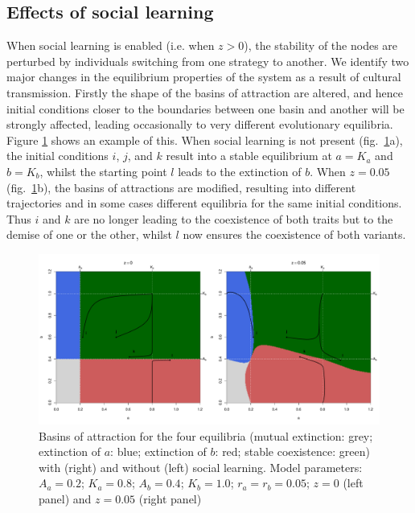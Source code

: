 \documentclass[3p,authoryear,twocolumn]{elsarticle} %
\begin{document}
\subsection{Effects of social learning}

When social learning is enabled (i.e. when $z>0$), the stability of the nodes are perturbed by individuals switching from one strategy to another. We identify two major changes in the equilibrium properties of the system as a result of cultural transmission. Firstly the shape of the basins of attraction are altered, and hence initial conditions closer to the boundaries between one basin and another will be strongly affected,  leading occasionally to very different evolutionary equilibria. Figure \ref{fig:TransmissionBasin} shows an example of this. When social learning is not present (fig.~\ref{fig:TransmissionBasin}a), the initial conditions $i$, $j$, and $k$ result into a stable equilibrium at $a=K_a$ and $b=K_b$, whilst the starting point $l$ leads to the extinction of $b$. When $z=0.05$ (fig.~\ref{fig:TransmissionBasin}b), the basins of attractions are modified, resulting into different trajectories and in some cases different equilibria for the same initial conditions. Thus $i$ and $k$ are no longer leading to the coexistence of both traits but to the demise of one or the other, whilst $l$ now ensures the coexistence of both variants. 

\begin{figure}
  \centering
      \includegraphics[width=2\columnwidth]{./figures/figure3.pdf}
  \caption{Basins of attraction for the four equilibria (mutual extinction: grey; extinction of $a$: blue; extinction of $b$: red; stable coexistence: green) with (right) and without (left) social learning. Model parameters: $A_a=0.2$; $K_a=0.8$; $A_b=0.4$; $K_b=1.0$; $r_a=r_b=0.05$; $z=0$ (left panel) and $z=0.05$ (right panel) }
    \label{fig:TransmissionBasin}
\end{figure}
\end{document}
